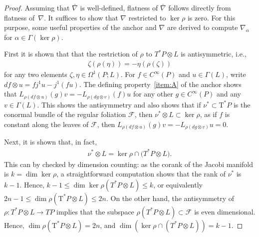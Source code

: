 \documentclass[10pt,a4paper]{amsart}
\numberwithin{equation}{section}
\newcommand{\cotan}{\mathrm{T}^*} %
\begin{document}
\begin{proof}Assuming that $\bar\nabla$ is well-def\/ined, f\/latness of $\bar\nabla$ follows directly from f\/latness of~$\nabla$. It suf\/f\/ices to show that $\nabla$ restricted to $\ker\rho$ is zero. For this purpose, some useful properties of the anchor and $\nabla$ are derived to compute $\nabla_\alpha$ for $\alpha\in\Gamma(\ker\rho)$.

First it is shown that that the restriction of $\rho$ to $T^*P\otimes L$ is antisymmetric, i.e.,
\begin{gather*}\zeta(\rho(\eta))=-\eta(\rho(\zeta))\end{gather*}
for any two elements $\zeta,\eta\in\Omega^{1}(P;L)$. For $f\in C^\infty(P)$ and $u\in\Gamma(L)$, write $df\otimes u=fj^1u-j^1(fu)$. The def\/ining property~\ref{item:A} of the anchor shows that $L_{\rho(df\otimes u)}(g)v=-L_{\rho(dg\otimes v)}(f)u$ for any other $g\in C^\infty(P)$ and any $v\in\Gamma(L)$. This shows the antisymmetry and also shows that if $\nu^*\subset \cotan P$ is the conormal bundle of the regular foliation $\mathcal{F}$, then $\nu^*\otimes L\subset\ker\rho$, as if $f$ is constant along the leaves of $\mathcal{F}$, then $L_{\rho(df\otimes u)}(g)v=-L_{\rho(dg\otimes v)}u=0.$

Next, it is shown that, in fact,
 \begin{gather*}\nu^*\otimes L=\ker\rho\cap \big(T^*P\otimes L\big).\end{gather*}
This can by checked by dimension counting: as the corank of the Jacobi manifold is $k=\dim\ker\rho$, a straightforward computation shows that the rank of $\nu^*$ is $k-1$. Hence, $k-1\leq \dim\ker\rho(T^*P\otimes L)\leq k$, or equivalently $ 2n - 1 \leq \dim \rho(\cotan P \otimes L) \leq 2n. $ On the other hand, the antisymmetry of $\rho\colon T^*P\otimes L\to TP$ implies that the subspace $\rho(T^*P\otimes L)\subset\mathcal{F}$ is even dimensional. Hence, $\dim \rho(\cotan P \otimes L)=2n$, and $\dim\left(\ker\rho\cap (T^*P\otimes L)\right)=k-1.$


\end{proof}
\end{document}
